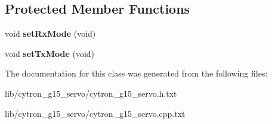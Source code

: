 \subsection*{Protected Member Functions}
\begin{DoxyCompactItemize}
\item 
void {\bfseries set\+Rx\+Mode} (void)\hypertarget{classCytron__G15__Servo_a013a1a4a96fbc62a080f98cac3045e3f}{}\label{classCytron__G15__Servo_a013a1a4a96fbc62a080f98cac3045e3f}

\item 
void {\bfseries set\+Tx\+Mode} (void)\hypertarget{classCytron__G15__Servo_a4946f6a94bdf877f189261001501c5d4}{}\label{classCytron__G15__Servo_a4946f6a94bdf877f189261001501c5d4}

\end{DoxyCompactItemize}


The documentation for this class was generated from the following files\+:\begin{DoxyCompactItemize}
\item 
lib/cytron\+\_\+g15\+\_\+servo/cytron\+\_\+g15\+\_\+servo.\+h.\+txt\item 
lib/cytron\+\_\+g15\+\_\+servo/cytron\+\_\+g15\+\_\+servo.\+cpp.\+txt\end{DoxyCompactItemize}
